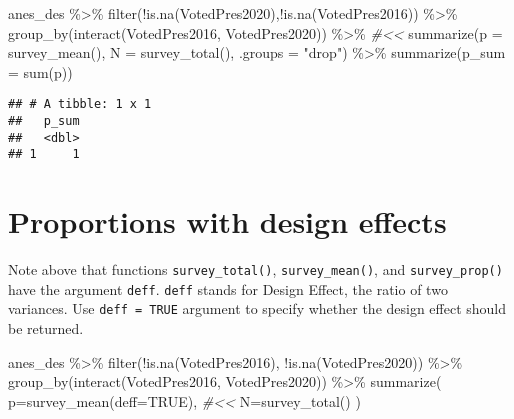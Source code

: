 \documentclass[
]{krantz}
\makeatletter
\newenvironment{Shaded}{\begin{snugshade}}{\end{snugshade}}
\newcommand{\AttributeTok}[1]{\textcolor[rgb]{0.61,0.61,0.61}{#1}}
\newcommand{\CommentTok}[1]{\textcolor[rgb]{0.37,0.37,0.37}{\textit{#1}}}
\newcommand{\ConstantTok}[1]{\textcolor[rgb]{0,0,0}{#1}}
\newcommand{\FunctionTok}[1]{\textcolor[rgb]{0,0,0}{#1}}
\newcommand{\NormalTok}[1]{#1}
\newcommand{\SpecialCharTok}[1]{\textcolor[rgb]{0,0,0}{#1}}
\newcommand{\StringTok}[1]{\textcolor[rgb]{0.5,0.5,0.5}{#1}}
\newenvironment{kframe}{%
\medskip{}
\setlength{\fboxsep}{.8em}
 \def\at@end@of@kframe{}%
 \ifinner\ifhmode%
  \def\at@end@of@kframe{\end{minipage}}%
  \begin{minipage}{\columnwidth}%
 \fi\fi%
 \def\FrameCommand##1{\hskip\@totalleftmargin \hskip-\fboxsep
 \colorbox{shadecolor}{##1}\hskip-\fboxsep
     \hskip-\linewidth \hskip-\@totalleftmargin \hskip\columnwidth}%
 \MakeFramed {\advance\hsize-\width
   \@totalleftmargin\z@ \linewidth\hsize
   \@setminipage}}%
 {\par\unskip\endMakeFramed%
 \at@end@of@kframe}
\renewenvironment{Shaded}{\begin{kframe}}{\end{kframe}}
\makeatother
\begin{document}
\begin{Shaded}
\begin{Highlighting}[]
\NormalTok{anes\_des }\SpecialCharTok{\%\textgreater{}\%}
  \FunctionTok{filter}\NormalTok{(}\SpecialCharTok{!}\FunctionTok{is.na}\NormalTok{(VotedPres2020),}\SpecialCharTok{!}\FunctionTok{is.na}\NormalTok{(VotedPres2016)) }\SpecialCharTok{\%\textgreater{}\%}
  \FunctionTok{group\_by}\NormalTok{(}\FunctionTok{interact}\NormalTok{(VotedPres2016, VotedPres2020)) }\SpecialCharTok{\%\textgreater{}\%} \CommentTok{\#\textless{}\textless{}}
  \FunctionTok{summarize}\NormalTok{(}\AttributeTok{p =} \FunctionTok{survey\_mean}\NormalTok{(),}
            \AttributeTok{N =} \FunctionTok{survey\_total}\NormalTok{(),}
            \AttributeTok{.groups =} \StringTok{"drop"}\NormalTok{) }\SpecialCharTok{\%\textgreater{}\%} 
  \FunctionTok{summarize}\NormalTok{(}\AttributeTok{p\_sum =} \FunctionTok{sum}\NormalTok{(p))}
\end{Highlighting}
\end{Shaded}

\begin{verbatim}
## # A tibble: 1 x 1
##   p_sum
##   <dbl>
## 1     1
\end{verbatim}

\hypertarget{proportions-with-design-effects}{%
\section{Proportions with design effects}\label{proportions-with-design-effects}}

Note above that functions \texttt{survey\_total()}, \texttt{survey\_mean()}, and \texttt{survey\_prop()} have the argument \texttt{deff}. \texttt{deff} stands for Design Effect, the ratio of two variances. Use \texttt{deff\ =\ TRUE} argument to specify whether the design effect should be returned.

\begin{Shaded}
\begin{Highlighting}[]
\NormalTok{anes\_des }\SpecialCharTok{\%\textgreater{}\%}
   \FunctionTok{filter}\NormalTok{(}\SpecialCharTok{!}\FunctionTok{is.na}\NormalTok{(VotedPres2016), }\SpecialCharTok{!}\FunctionTok{is.na}\NormalTok{(VotedPres2020)) }\SpecialCharTok{\%\textgreater{}\%}
   \FunctionTok{group\_by}\NormalTok{(}\FunctionTok{interact}\NormalTok{(VotedPres2016, VotedPres2020)) }\SpecialCharTok{\%\textgreater{}\%} 
   \FunctionTok{summarize}\NormalTok{(}
      \AttributeTok{p=}\FunctionTok{survey\_mean}\NormalTok{(}\AttributeTok{deff=}\ConstantTok{TRUE}\NormalTok{), }\CommentTok{\#\textless{}\textless{}}
      \AttributeTok{N=}\FunctionTok{survey\_total}\NormalTok{()}
\NormalTok{   )}
\end{Highlighting}
\end{Shaded}
\end{document}
